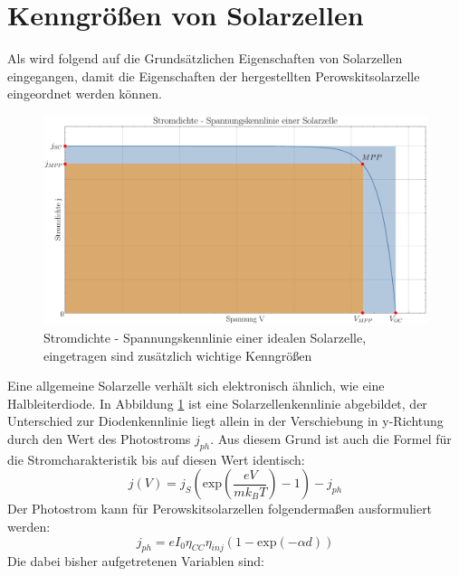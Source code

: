 \documentclass[12pt,a4paper,ngerman]{report}
\begin{document}
	\section{Kenngrößen von Solarzellen}\label{ch:Kenngrößen}
	Als wird folgend auf die Grundsätzlichen Eigenschaften von Solarzellen eingegangen, damit die Eigenschaften der hergestellten Perowskitsolarzelle eingeordnet werden können.\\
	\begin{figure}[ht]
		\centering
		\includegraphics[width=\textwidth]{Bilder/SolarzelleIdeal.pdf}		
		\caption[Kennlinie ideale Solarzelle]{Stromdichte - Spannungskennlinie einer idealen Solarzelle, eingetragen sind zusätzlich wichtige Kenngrößen}
		\label{img:SolarzelleIdeal}
	\end{figure}
	Eine allgemeine Solarzelle verhält sich elektronisch ähnlich, wie eine Halbleiterdiode. In Abbildung \ref{img:SolarzelleIdeal} ist eine Solarzellenkennlinie abgebildet, der Unterschied zur Diodenkennlinie liegt allein in der Verschiebung in y-Richtung durch den Wert des Photostroms $j_{ph}$. Aus diesem Grund ist auch die Formel für die Stromcharakteristik bis auf diesen Wert identisch:
	\begin{equation}\label{eq:kennlinie}
		j(V) =  j_S \left(\text{exp}\left(\frac{e V}{m k_B T}\right) - 1\right) - j_{ph}
	\end{equation} 
	Der Photostrom kann für Perowskitsolarzellen folgendermaßen ausformuliert werden:
	\begin{equation}
		j_{ph} = e I_0 \eta_{CC} \eta_{inj} (1-\text{exp}(-\alpha d))
	\end{equation}
	Die dabei bisher aufgetretenen Variablen sind:
\end{document}
